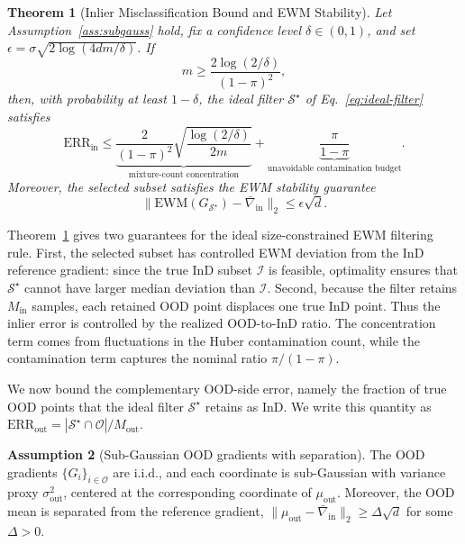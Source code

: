 \documentclass[10pt]{article} %
\theoremstyle{plain}
\newtheorem{theorem}{Theorem}[section]
\theoremstyle{definition}
\newtheorem{assumption}[theorem]{Assumption}
\begin{document}
\begin{tcolorbox}[
colback=BoxBodyGreen,
coltitle=black,
colframe=Primary,
arc=1.5pt,
boxrule=1pt,
left=6pt,right=6pt,top=6pt,bottom=6pt,
breakable
]
\begin{theorem}[Inlier Misclassification Bound and EWM Stability]
\label{thm:inlier_misclassification_bound}
Let Assumption~\ref{ass:subgauss} hold, fix a confidence level $\delta \in (0,1)$, and
set $\epsilon = \sigma\sqrt{2\log(4dm/\delta)}$. If
\begin{equation*}
m \geq \frac{2\log(2/\delta)}{(1-\pi)^2},
\end{equation*}
then, with probability at least $1-\delta$, the ideal filter $\mathcal{S}^\star$ of
Eq.~\ref{eq:ideal-filter} satisfies
\begin{equation*}
\mathrm{ERR}_{\mathrm{in}} \leq 
\underbrace{\frac{2}{(1-\pi)^2}\sqrt{\frac{\log(2/\delta)}{2m}}}_{\text{mixture-count concentration}} 
+ 
\underbrace{\frac{\pi}{1-\pi}}_{\text{unavoidable contamination budget}} .
\end{equation*}
Moreover, the selected subset satisfies the EWM stability guarantee
\[
\big\| \mathrm{EWM}(G_{\mathcal{S}^\star}) - \bar{\nabla}_{\mathrm{in}} \big\|_2
\leq \epsilon\sqrt{d}.
\]
\end{theorem}
\end{tcolorbox}

Theorem~\ref{thm:inlier_misclassification_bound} gives two guarantees
for the ideal size-constrained EWM filtering rule. First, the selected
subset has controlled EWM deviation from the InD reference gradient:
since the true InD subset \(\mathcal{I}\) is feasible, optimality ensures that
\(\mathcal{S}^\star\) cannot have larger median deviation than \(\mathcal{I}\).
Second, because the filter retains \(M_{\mathrm{in}}\) samples, each retained
OOD point displaces one true InD point. Thus the inlier error is controlled
by the realized OOD-to-InD ratio. The concentration term comes from
fluctuations in the Huber contamination count, while the contamination term
captures the nominal ratio \(\pi/(1-\pi)\).

We now bound the complementary OOD-side error, namely the fraction of true
OOD points that the ideal filter \(\mathcal{S}^\star\) retains as InD. We
write this quantity as
\(\mathrm{ERR}_{\mathrm{out}} =
|\mathcal{S}^\star \cap \mathcal{O}| / M_{\mathrm{out}}\). 

\vspace{1em}

\begin{assumption}[Sub-Gaussian OOD gradients with separation]
\label{ass:subgauss-out}
The OOD gradients $\{G_i\}_{i \in \mathcal{O}}$ are i.i.d., and each coordinate is
sub-Gaussian with variance proxy $\sigma_{\mathrm{out}}^2$, centered at the corresponding
coordinate of $\mu_{\mathrm{out}}$. Moreover, the OOD mean is separated from the reference
gradient, $\big\| \mu_{\mathrm{out}} - \bar{\nabla}_{\mathrm{in}} \big\|_2 \geq
\Delta\sqrt{d}$ for some $\Delta > 0$.
\end{assumption}
\end{document}
